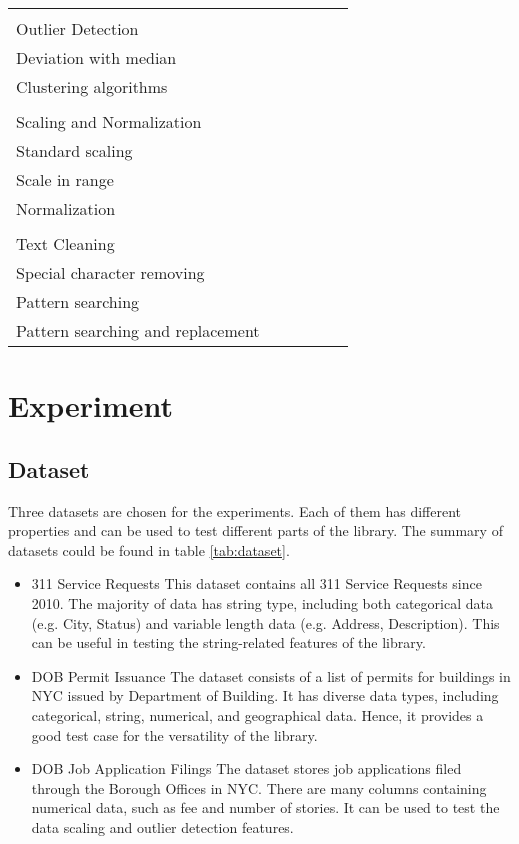 \documentclass[sigconf]{acmart}
\begin{document}
\begin{table*}
\begin{tabular}{lccccc}
&&&&& \\
Outlier Detection &&&&& \\
\hline
Deviation with median			&						& 			& \checkmark		&							&			\\
Clustering algorithms			&						& \checkmark	& 				&							&			\\	
	
&&&&& \\
Scaling and Normalization &&&&& \\
\hline
Standard scaling				&						& \checkmark	& 				&							& \checkmark	\\		
Scale in range				&						& \checkmark	& 				&							& \checkmark	\\
Normalization				&						& \checkmark	& 				&							& 			\\



&&&&& \\
Text Cleaning &&&&& \\
\hline
Special character removing		& \checkmark				& \checkmark	& \checkmark		&							&		\\
Pattern searching 			 	& \checkmark				& \checkmark	& \checkmark		&							&		\\		
Pattern searching and replacement 	&						& \checkmark	&				&							&		\\
\end{tabular}
\end{table*}


\section{Experiment}
\subsection{Dataset}
Three datasets are chosen for the experiments. Each of them has different properties and can be used to test different parts of the library. The summary of datasets could be found in table \ref{tab:dataset}.
\begin{itemize}
	\item{311 Service Requests}\cite{nycopendata1} This dataset contains all 311 Service Requests since 2010. The majority of data has string type, including both categorical  data (e.g. City, Status) and variable length data (e.g. Address, Description). This can be useful in testing the string-related features of the library.
	\item{DOB Permit Issuance}\cite{nycopendata2} The dataset consists of a list of permits for buildings in NYC issued by Department of Building. It has diverse data types, including categorical, string, numerical, and geographical data. Hence, it provides a good test case for the versatility of the library. 
	\item{DOB Job Application Filings}\cite{nycopendata3} The dataset stores job applications filed through the Borough Offices in NYC. There are many columns containing numerical data, such as fee and number of stories. It can be used to test the data scaling and outlier detection features. 
\end{itemize}
\end{document}
